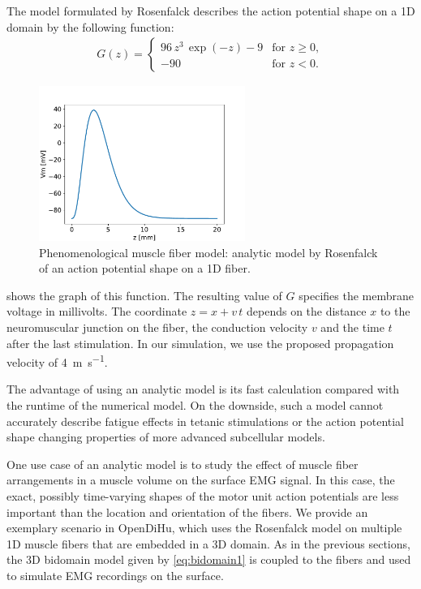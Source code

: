 The model formulated by Rosenfalck \cite{Rosenfalck1969} describes the action potential shape on a 1D domain by the following function:
%
\begin{align*}
  G(z) = \begin{cases}
    96\,z^3\,\exp(-z) - 9 & \text{for } z \geq 0,\\[4mm]
    -90  & \text{for } z < 0.
  \end{cases}  
\end{align*}

\begin{figure}
  \centering%
  \includegraphics[width=0.6\textwidth]{images/results/application/rosenfalck_function.pdf}%
  \caption{Phenomenological muscle fiber model: analytic model by Rosenfalck of an action potential shape on a 1D fiber.}%
  \label{fig:rosenfalck_function}%
\end{figure}
 shows the graph of this function. The resulting value of $G$ specifies the membrane voltage in millivolts. The coordinate $z=x+v\,t$ depends on the distance $x$ to the neuromuscular junction on the fiber, the conduction velocity $v$ and the time $t$ after the last stimulation. In our simulation, we use the proposed propagation velocity of \SI{4}{\meter\per\second}.

The advantage of using an analytic model is its fast calculation compared with the runtime of the numerical model. On the downside, such a model cannot accurately describe fatigue effects in tetanic stimulations or the action potential shape changing properties of more advanced subcellular models.

One use case of an analytic model is to study the effect of muscle fiber arrangements in a muscle volume on the surface EMG signal. In this case, the exact, possibly time-varying shapes of the motor unit action potentials are less important than the location and orientation of the fibers.
We provide an exemplary scenario in OpenDiHu, which uses the Rosenfalck model on multiple 1D muscle fibers that are embedded in a 3D domain. As in the previous sections, the 3D bidomain model given by \cref{eq:bidomain1} is coupled to the fibers and used to simulate EMG recordings on the surface. 

